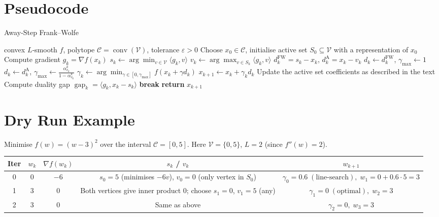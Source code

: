 \documentclass{article}
\newcommand{\C}{\mathcal{C}}
\newcommand{\V}{\mathcal{V}}
\newcommand{\gap}{\operatorname{gap}}
\begin{document}
\section*{Pseudocode}
\begin{algorithm}[H]
\caption{Away‑Step Frank–Wolfe}
\begin{algorithmic}[1]
\Require convex $L$‑smooth $f$, polytope $\C=\operatorname{conv}(\V)$, tolerance $\varepsilon>0$
\State Choose $x_{0}\in\C$, initialise active set $S_{0}\subseteq\V$ with a representation of $x_{0}$
    \State Compute gradient $g_{k}= \nabla f(x_{k})$
    \State $s_{k}\gets\arg\min_{v\in\V}\langle g_{k},v\rangle$ 
    \State $v_{k}\gets\arg\max_{v\in S_{k}}\langle g_{k},v\rangle$ 
    \State $d^{\text{FW}}_{k}=s_{k}-x_{k}$, $d^{\text{A}}_{k}=x_{k}-v_{k}$
        \State $d_{k}\gets d^{\text{FW}}_{k}$, $\gamma_{\max}\gets 1$
    \Else
        \State $d_{k}\gets d^{\text{A}}_{k}$, $\displaystyle
        \gamma_{\max}\gets\frac{\alpha^{k}_{v_{k}}}{1-\alpha^{k}_{v_{k}}}$
    \EndIf
    \State $\displaystyle\gamma_{k}\gets\arg\min_{\gamma\in[0,\gamma_{\max}]}
          f(x_{k}+\gamma d_{k})$ 
    \State $x_{k+1}\gets x_{k}+ \gamma_{k} d_{k}$
    \State Update the active set coefficients as described in the text
    \State Compute duality gap $\gap_{k}= \langle g_{k},x_{k}-s_{k}\rangle$
    \If{$\gap_{k}\le\varepsilon$}
        \State \textbf{break}
    \EndIf
\EndFor
\State \textbf{return} $x_{k+1}$
\end{algorithmic}
\end{algorithm}

\section*{Dry Run Example}
Minimise $f(w)=(w-3)^{2}$ over the interval $\C=[0,5]$.
Here $\V=\{0,5\}$, $L=2$ (since $f''(w)=2$).

\begin{tabular}{c|c|c|c|c}
\textbf{Iter} & $w_{k}$ & $\nabla f(w_{k})$ & $s_{k}$ / $v_{k}$ & $w_{k+1}$ \\ \hline
0 & $0$ & $-6$ &
$\displaystyle s_{0}=5$ (minimises $-6v$), $v_{0}=0$ (only vertex in $S_{0}$) &
$\displaystyle\gamma_{0}=0.6\;( \text{line‑search}),\;
w_{1}=0+0.6\cdot5=3$ \\ \hline
1 & $3$ & $0$ &
Both vertices give inner product $0$; choose $s_{1}=0$, $v_{1}=5$ (any) &
$\displaystyle\gamma_{1}=0\;( \text{optimal}),\; w_{2}=3$ \\ \hline
2 & $3$ & $0$ &
Same as above & $\gamma_{2}=0,\; w_{3}=3$ \\ \hline
\end{tabular}
\end{document}
